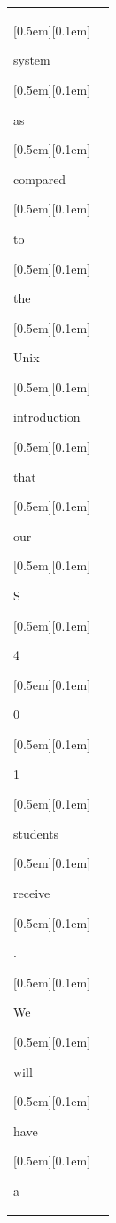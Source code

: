 \begin{table}[ht]
\begin{tabular}{@{}l p{13cm}@{}}
{\setlength{\fboxsep}{1pt}\raisebox{0pt}[0.5em][0.1em]{\colorbox{Salmon!60}{\strut{ system}}}}{\setlength{\fboxsep}{1pt}\raisebox{0pt}[0.5em][0.1em]{\colorbox{Salmon!60}{\strut{ as}}}}{\setlength{\fboxsep}{1pt}\raisebox{0pt}[0.5em][0.1em]{\colorbox{DarkOrchid!25}{\strut{ compared}}}}{\setlength{\fboxsep}{1pt}\raisebox{0pt}[0.5em][0.1em]{\colorbox{SkyBlue!55}{\strut{ to}}}}{\setlength{\fboxsep}{1pt}\raisebox{0pt}[0.5em][0.1em]{\colorbox{SkyBlue!55}{\strut{ the}}}}{\setlength{\fboxsep}{1pt}\raisebox{0pt}[0.5em][0.1em]{\colorbox{Salmon!60}{\strut{ Unix}}}}{\setlength{\fboxsep}{1pt}\raisebox{0pt}[0.5em][0.1em]{\colorbox{Salmon!60}{\strut{ introduction}}}}{\setlength{\fboxsep}{1pt}\raisebox{0pt}[0.5em][0.1em]{\colorbox{Salmon!60}{\strut{ that}}}}{\setlength{\fboxsep}{1pt}\raisebox{0pt}[0.5em][0.1em]{\colorbox{SkyBlue!55}{\strut{ our}}}}{\setlength{\fboxsep}{1pt}\raisebox{0pt}[0.5em][0.1em]{\colorbox{DarkOrchid!25}{\strut{ S}}}}{\setlength{\fboxsep}{1pt}\raisebox{0pt}[0.5em][0.1em]{\colorbox{Salmon!60}{\strut{4}}}}{\setlength{\fboxsep}{1pt}\raisebox{0pt}[0.5em][0.1em]{\colorbox{Salmon!60}{\strut{0}}}}{\setlength{\fboxsep}{1pt}\raisebox{0pt}[0.5em][0.1em]{\colorbox{Salmon!60}{\strut{1}}}}{\setlength{\fboxsep}{1pt}\raisebox{0pt}[0.5em][0.1em]{\colorbox{Salmon!60}{\strut{ students}}}}{\setlength{\fboxsep}{1pt}\raisebox{0pt}[0.5em][0.1em]{\colorbox{Salmon!60}{\strut{ receive}}}}{\setlength{\fboxsep}{1pt}\raisebox{0pt}[0.5em][0.1em]{\colorbox{DarkOrchid!25}{\strut{.}}}}{\setlength{\fboxsep}{1pt}\raisebox{0pt}[0.5em][0.1em]{\colorbox{DarkOrchid!25}{\strut{ We}}}}{\setlength{\fboxsep}{1pt}\raisebox{0pt}[0.5em][0.1em]{\colorbox{Salmon!60}{\strut{ will}}}}{\setlength{\fboxsep}{1pt}\raisebox{0pt}[0.5em][0.1em]{\colorbox{SkyBlue!55}{\strut{ have}}}}{\setlength{\fboxsep}{1pt}\raisebox{0pt}[0.5em][0.1em]{\colorbox{SkyBlue!55}{\strut{ a}}}}


\end{tabular}
\end{table}
